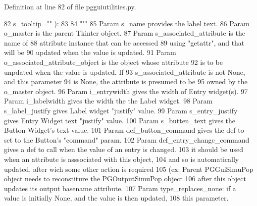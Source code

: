 Definition at line 82 of file pgguiutilities.\+py.


\begin{DoxyCode}
82             s\_tooltip=\textcolor{stringliteral}{""} ):
83         
84         \textcolor{stringliteral}{"""}
85 \textcolor{stringliteral}{        Param s\_name provides the label text.}
86 \textcolor{stringliteral}{        Param o\_master is the parent Tkinter object.}
87 \textcolor{stringliteral}{        Param s\_associated\_attribute is the name of }
88 \textcolor{stringliteral}{            attribute instance that can be accessed}
89 \textcolor{stringliteral}{            using "getattr", and that will be}
90 \textcolor{stringliteral}{            updated when the value is updated.}
91 \textcolor{stringliteral}{        Param o\_associated\_attribute\_object is the object whose attribute}
92 \textcolor{stringliteral}{            is to be unpdated when the value is updated.  If}
93 \textcolor{stringliteral}{            s\_associated\_attribute is not None, and this parameter}
94 \textcolor{stringliteral}{            is None, the attribute is presumed to be}
95 \textcolor{stringliteral}{            owned by the o\_master object.}
96 \textcolor{stringliteral}{        Param i\_entrywidth gives the width of Entry widget(s).}
97 \textcolor{stringliteral}{        Param i\_labelwidth gives the width the the Label widget.}
98 \textcolor{stringliteral}{        Param s\_label\_justify gives Label widget "justify" value.}
99 \textcolor{stringliteral}{        Param s\_entry\_justify gives Entry Widget text "justify" value.}
100 \textcolor{stringliteral}{        Param s\_butten\_text gives the Button Widget's text value.}
101 \textcolor{stringliteral}{        Param def\_button\_command gives the def to set to the Button's "command" param.}
102 \textcolor{stringliteral}{        Param def\_entry\_change\_command gives a def to call when the value of an entry is changed.           
        }
103 \textcolor{stringliteral}{              it should be used when an attribute is asssociated with this object,}
104 \textcolor{stringliteral}{              and so is automatically updated, after wich some other action is required }
105 \textcolor{stringliteral}{              (ex: Parent PGGuiSimuPop object needs to reconstiture the PGOutputSimuPop object }
106 \textcolor{stringliteral}{              after this object updates its output basename attribute.}
107 \textcolor{stringliteral}{        Param type\_replaces\_none: if a value is initially None, and the value is then updated, }
108 \textcolor{stringliteral}{              this parameter.}

\end{DoxyCode}
